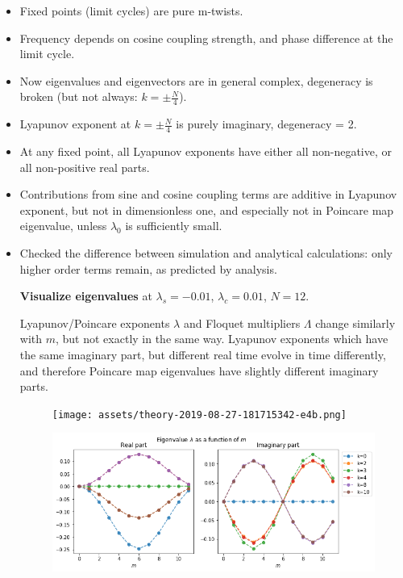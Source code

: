 \documentclass[a4paper,12pt]{article}
\begin{document}
\begin{itemize}
\item Fixed points (limit cycles) are pure m-twists.
\item Frequency depends on cosine coupling strength, and phase difference at the limit cycle.
\item Now eigenvalues and eigenvectors are in general complex, degeneracy is broken (but not always: $k=\pm \frac{N}{4}$).
\item Lyapunov exponent at $k=\pm\frac{N}{4}$  is purely imaginary, degeneracy = 2.
\item At any fixed point, all Lyapunov exponents have either all non-negative, or all non-positive real parts.
\item Contributions from sine and cosine coupling terms are additive in Lyapunov exponent, but not in dimensionless one, and especially not in Poincare map eigenvalue, unless $\lambda_0$ is sufficiently small. 
\item Checked the difference between simulation and analytical calculations: only higher order terms remain, as predicted by analysis.


\textbf{Visualize eigenvalues} at 
$\lambda_s = - 0.01$, $\lambda_c = 0.01$, $N=12$.

Lyapunov/Poincare exponents $\lambda$ and Floquet multipliers $\Lambda$ change similarly with $m$, but not exactly in the same way. Lyapunov exponents which have the same imaginary part, but different real time evolve in time differently, and therefore Poincare map eigenvalues have slightly different imaginary parts.

\begin{figure}[h]
    \centering
    \texttt{[image: assets/theory-2019-08-27-181715342-e4b.png]}
\end{figure}


\begin{figure}[h]
    \centering
    \includegraphics[width=.95\textwidth]{assets/theory-2019-08-27-181719526-a8d.png}
\end{figure}


\end{itemize}
\end{document}

